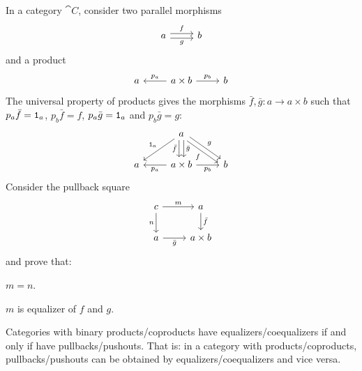 \begin{exercise}
  In a category \(\cat C\), consider two parallel morphisms
  \[\begin{tikzcd}
      a \ar["f", r, shift left] \ar["g", r, shift right, swap] & b
    \end{tikzcd}\] and a product
  \[\begin{tikzcd}
      a & a \times b \ar["{p_a}", l, swap] \ar["{p_b}", r] & b
    \end{tikzcd}\] The universal property of products gives the
  morphisms \(\bar f, \bar g : a \to a \times b\) such that
  \(p_a \bar f = \mathtt 1_a\), \(p_b \bar f = f\), \(p_a \bar g = \mathtt 1_a\)
  and \(p_b \bar g = g\):
  \[\begin{tikzcd}
      & a \ar["{\id_a}", dl, swap] \ar["{\bar f}", d, shift right, swap] \ar["{\bar g}", d, shift left] \ar["f", dr, shift right, swap] \ar["g", dr, shift left] \\
      a & a \times b \ar["{p_a}", l] \ar["{p_b}", r, swap] & b
    \end{tikzcd}\] Consider the pullback square
  \[\begin{tikzcd}
      c \ar["m", r] \ar["n", d, swap] & a \ar["{\bar f}", d] \\
      a \ar["{\bar g}", r, swap] & a \times b
    \end{tikzcd}\] and prove that:
  \begin{tcbenum}
  \item \(m = n\).
  \item \(m\) is equalizer of \(f\) and \(g\).
  \end{tcbenum}
\end{exercise}


\begin{proposition}
  Categories with binary products/coproducts have
  equalizers/coequalizers if and only if have pullbacks/pushouts. That
  is: in a category with products/coproducts, pullbacks/pushouts can
  be obtained by equalizers/coequalizers and vice versa.
\end{proposition}




